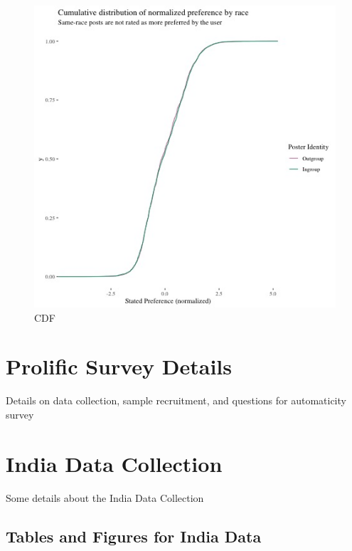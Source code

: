 \documentclass[12pt,letterpaper]{article}
\begin{document}
\begin{figure}[!h]
    \centering
    \includegraphics[scale=.8]{Output/Graphs/Audit/Stated preferences/US NF cdf norm preferences by ingroup.jpg}
    \caption{CDF}
    \label{fig:prefcdf}
\end{figure}

\section{Prolific Survey Details}\label{app:survey}

Details on data collection, sample recruitment, and questions for automaticity survey

\section{India Data Collection}\label{app:india}
Some details about the India Data Collection

\subsection{Tables and Figures for India Data}
\end{document}
